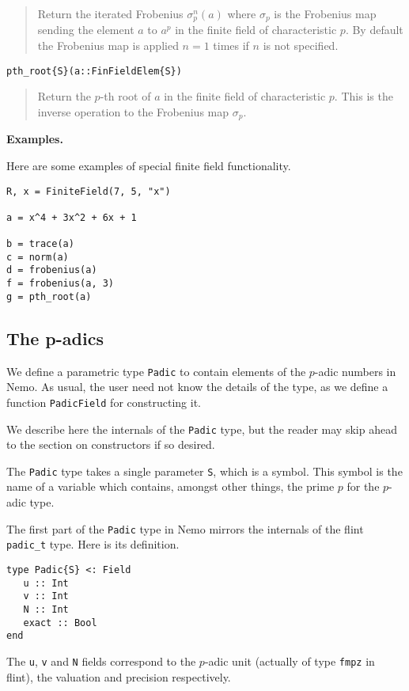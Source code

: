 \documentclass[a4paper,10pt]{article}
\newcommand{\code}{\lstinline}
\newcommand{\desc}[1]{\vspace{-3mm}\begin{quote}#1\end{quote}}
\begin{document}
{{\desc{Return the iterated Frobenius $\sigma_p^n(a)$ where $\sigma_p$ is the 
Frobenius map sending the element $a$ to $a^p$ in the finite field of 
characteristic $p$. By default the Frobenius map is applied $n = 1$ times if
$n$ is not specified.}

\begin{lstlisting}
pth_root{S}(a::FinFieldElem{S})
\end{lstlisting}

\desc{Return the $p$-th root of $a$ in the finite field of characteristic
$p$. This is the inverse operation to the Frobenius map $\sigma_p$.}

\textbf{Examples.}

Here are some examples of special finite field functionality.

\begin{lstlisting}
R, x = FiniteField(7, 5, "x")

a = x^4 + 3x^2 + 6x + 1

b = trace(a)
c = norm(a)
d = frobenius(a)
f = frobenius(a, 3)
g = pth_root(a)
\end{lstlisting}

\subsection{The p-adics}

We define a parametric type \code{Padic} to contain elements of the $p$-adic
numbers in Nemo. As usual, the user need not know the details of the type, as
we define a function \code{PadicField} for constructing it.

We describe here the internals of the \code{Padic} type, but the reader may
skip ahead to the section on constructors if so desired.

The \code{Padic} type takes a single parameter \code{S}, which is a symbol.
This symbol is the name of a variable which contains, amongst other things,
the prime $p$ for the $p$-adic type.

The first part of the \code{Padic} type in Nemo mirrors the internals of the
flint \code{padic_t} type. Here is its definition.

\begin{lstlisting}
type Padic{S} <: Field
   u :: Int 
   v :: Int
   N :: Int
   exact :: Bool
end
\end{lstlisting}

The \code{u}, \code{v} and \code{N} fields correspond to the $p$-adic unit
(actually of type \code{fmpz} in flint), the valuation and precision
respectively. 

}}
\end{document}

